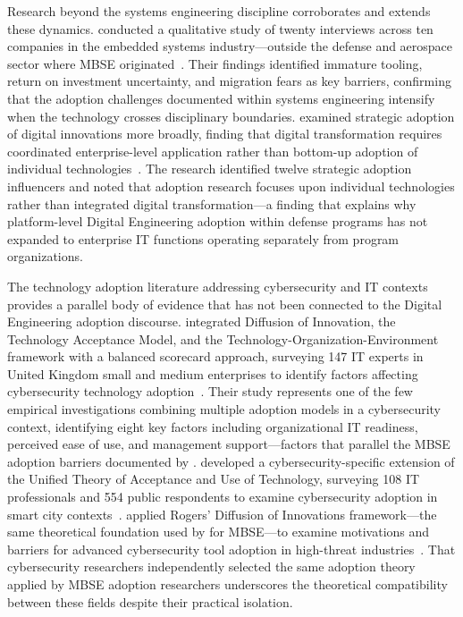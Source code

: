 Research beyond the systems engineering discipline corroborates and extends these dynamics. \citeauthor{Vogelsang_2017} conducted a qualitative study of twenty interviews across ten companies in the embedded systems industry---outside the defense and aerospace sector where MBSE originated~\parencite{Vogelsang_2017}. Their findings identified immature tooling, return on investment uncertainty, and migration fears as key barriers, confirming that the adoption challenges documented within systems engineering intensify when the technology crosses disciplinary boundaries. \citeauthor{Campagna_2024} examined strategic adoption of digital innovations more broadly, finding that digital transformation requires coordinated enterprise-level application rather than bottom-up adoption of individual technologies~\parencite{Campagna_2024}. The research identified twelve strategic adoption influencers and noted that adoption research focuses upon individual technologies rather than integrated digital transformation---a finding that explains why platform-level Digital Engineering adoption within defense programs has not expanded to enterprise IT functions operating separately from program organizations.

The technology adoption literature addressing cybersecurity and IT contexts provides a parallel body of evidence that has not been connected to the Digital Engineering adoption discourse. \citeauthor{Hasani_2023} integrated Diffusion of Innovation, the Technology Acceptance Model, and the Technology-Organization-Environment framework with a balanced scorecard approach, surveying 147 IT experts in United Kingdom small and medium enterprises to identify factors affecting cybersecurity technology adoption~\parencite{Hasani_2023}. Their study represents one of the few empirical investigations combining multiple adoption models in a cybersecurity context, identifying eight key factors including organizational IT readiness, perceived ease of use, and management support---factors that parallel the MBSE adoption barriers documented by \citeauthor{Henderson_McDermott_Salado_2024}. \citeauthor{Alghamdi_2023} developed a cybersecurity-specific extension of the Unified Theory of Acceptance and Use of Technology, surveying 108 IT professionals and 554 public respondents to examine cybersecurity adoption in smart city contexts~\parencite{Alghamdi_2023}. \citeauthor{Anthony_2024} applied Rogers' Diffusion of Innovations framework---the same theoretical foundation used by \citeauthor{Call_2024} for MBSE---to examine motivations and barriers for advanced cybersecurity tool adoption in high-threat industries~\parencite{Anthony_2024}. That cybersecurity researchers independently selected the same adoption theory applied by MBSE adoption researchers underscores the theoretical compatibility between these fields despite their practical isolation.

